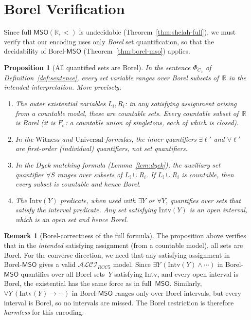 \documentclass[a4paper,11pt]{article}
\newtheorem{proposition}[theorem]{Proposition}
\theoremstyle{definition}
\newtheorem{remark}[theorem]{Remark}
\newcommand{\ALCIRCC}[1]{\ensuremath{\mathcal{ALCI}_{\mathit{RCC#1}}}}
\newcommand{\MSO}{\ensuremath{\mathsf{MSO}}}
\newcommand{\reals}{\ensuremath{\mathbb{R}}}
\begin{document}
\section{Borel Verification}
\label{sec:borel-check}

Since full $\MSO(\reals, <)$ is undecidable
(Theorem~\ref{thm:shelah-full}), we must verify that our encoding
uses only \emph{Borel} set quantification, so that the decidability
of Borel-$\MSO$ (Theorem~\ref{thm:borel-mso}) applies.

\begin{proposition}[All quantified sets are Borel]
\label{prop:borel}
In the sentence $\Phi_{C_0}$ of Definition~\ref{def:sentence},
every set variable ranges over Borel subsets of~$\reals$ in the
intended interpretation.  More precisely:
\begin{enumerate}[nosep,label=(\roman*)]
  \item The outer existential variables $L_i, R_i$: in any
    satisfying assignment arising from a countable model, these are
    \emph{countable} sets.  Every countable subset of~$\reals$ is
    Borel \textup{(}it is $F_\sigma$: a countable union of
    singletons, each of which is closed\textup{)}.
  \item In the $\mathrm{Witness}$ and $\mathrm{Universal}$
    formulas, the inner quantifiers $\exists \ell'$ and
    $\forall \ell'$ are first-order \textup{(}individual\textup{)}
    quantifiers, not set quantifiers.
  \item In the Dyck matching formula
    \textup{(}Lemma~\ref{lem:dyck}\textup{)}, the auxiliary set
    quantifier $\forall S$ ranges over subsets of
    $L_i \cup R_i$.  If $L_i \cup R_i$ is countable, then
    every subset is countable and hence Borel.
  \item The $\mathrm{Intv}(Y)$ predicate, when used with
    $\exists Y$ or $\forall Y$, quantifies over sets that satisfy
    the interval predicate.  Any set satisfying $\mathrm{Intv}(Y)$
    is an open interval, which is an open set and hence Borel.
\end{enumerate}
\end{proposition}

\begin{remark}[Borel-correctness of the full formula]
The proposition above verifies that in the \emph{intended} satisfying
assignment (from a countable model), all sets are Borel.  For the
converse direction, we need that any satisfying assignment in
Borel-$\MSO$ gives a valid $\ALCIRCC{5}$ model.  Since
$\exists Y\,(\mathrm{Intv}(Y) \land \cdots)$ in Borel-$\MSO$
quantifies over all Borel sets~$Y$ satisfying $\mathrm{Intv}$, and
every open interval is Borel, the existential has the same force as
in full~$\MSO$.  Similarly, $\forall Y\,(\mathrm{Intv}(Y) \to
\cdots)$ in Borel-$\MSO$ ranges only over Borel intervals, but
every interval is Borel, so no intervals are missed.  The Borel
restriction is therefore \emph{harmless} for this encoding.
\end{remark}
\end{document}
